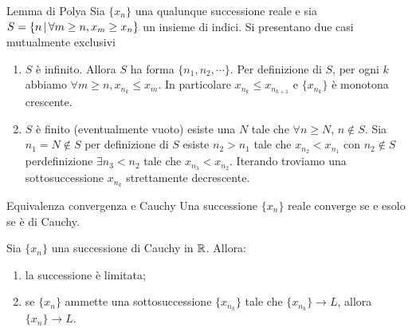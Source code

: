 \documentclass[a4paper]{article}
\begin{document}
\begin{snippetproof}{Lemma di Polya}
    Sia \(\{x_n\}\) una qualunque successione reale e sia
    \(S = \{n \,|\, \forall m \geq n, x_m \geq x_n\}\) un insieme di indici.
    Si presentano due casi mutualmente exclusivi
    \begin{enumerate}
        \item \(S\) è infinito. Allora \(S\) ha forma \(\{n_1, n_2, \cdots\}\).
        Per definizione di \(S\), per ogni \(k\) abbiamo \(\forall m \geq n, x_{n_k} \leq x_m\).
        In particolare \(x_{n_k} \leq x_{n_{k+1}}\) e \(\{x_{n_k}\}\) è monotona crescente.
        \item \(S\) è finito (eventualmente vuoto) esiste una \(N\) tale che \(\forall n \geq N\),
        \(n \notin S\). Sia \(n_1 = N \notin S\) per definizione di \(S\)
        esiste \(n_2>n_1\) tale che \(x_{n_2} < x_{n_1}\)
        con \(n_2 \notin S\) perdefinizione \(\exists n_3 < n_2\) tale che
        \(x_{n_3} < x_{n_2}\). Iterando troviamo una sottosuccessione \(x_{n_k}\) strettamente decrescente.
    \end{enumerate}
\end{snippetproof}

\begin{snippettheorem}{Equivalenza convergenza e Cauchy}
    Una successione \(\{x_n\}\) reale converge se e esolo se è di Cauchy.
\end{snippettheorem}

\begin{snippetlemma}{}
    Sia \(\{x_n\}\) una successione di Cauchy in \(\mathbb{R}\).
    Allora:
    \begin{enumerate}
        \item la successione è limitata;
        \item se \(\{x_n\}\) ammette una sottosuccessione \(\{x_{n_k}\}\) tale che
        \(\{x_{n_k}\} \to L\), allora \(\{x_n\} \to L\).
    \end{enumerate}
\end{snippetlemma}
\end{document}
